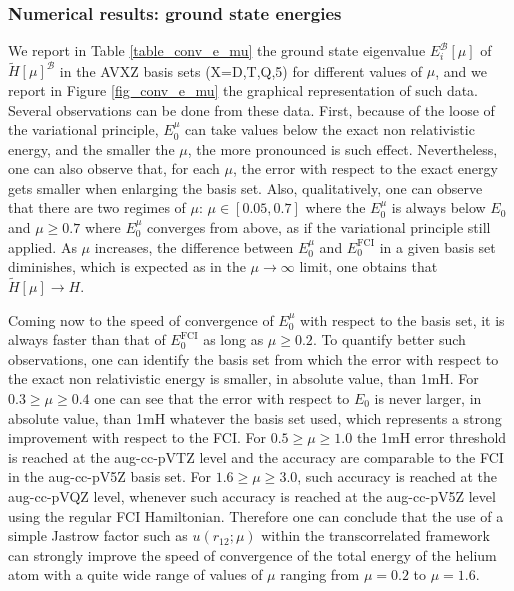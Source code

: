 \documentclass[aip,jcp,reprint,noshowkeys,superscriptaddress]{revtex4-1}
\newcommand{\basis}[0]{\mathcal{B}}
\begin{document}
\subsubsection{Numerical results: ground state energies}
\label{sec:total_e}
We report in Table \ref{table_conv_e_mu} the ground state eigenvalue $E_i^{\basis}[\mu]$ of $\tilde{H}[\mu]^{\basis}$ in the AVXZ basis sets (X=D,T,Q,5) for different values of $\mu$, and we report in Figure \ref{fig_conv_e_mu} the graphical representation of such data. 
Several observations can be done from these data. First, because of the loose of the variational principle, $E_0^{\mu}$ can take values below the exact non relativistic energy, and the smaller the $\mu$, the more pronounced is such effect. 
Nevertheless, one can also observe that, for each $\mu$, the error with respect to the exact energy gets smaller  
when enlarging the basis set. Also, qualitatively, one can observe that there are two regimes of $\mu$: $\mu \in[0.05,0.7]$ where the $E_0^\mu$ is always below $E_0$ and $\mu\ge 0.7$ where $E_0^\mu$ converges from above, as if the variational principle still applied. 
As $\mu$ increases, the difference between $E_0^\mu$ and $E_0^\text{FCI}$ in a given basis set diminishes, 
which is expected as in the $\mu \rightarrow \infty$ limit, one obtains that  $\tilde{H}[\mu] \rightarrow H$. 

Coming now to the speed of convergence of $E_0^\mu$ with respect to the basis set, it is always faster than that of $E_0^\text{FCI}$ as long as $\mu \ge 0.2$. 
To quantify better such observations, one can identify the basis set from which the error with respect to the exact non relativistic energy is smaller, in absolute value, than 1mH. 
For $0.3\ge\mu\ge0.4$ one can see that the error with respect to $E_0$ is never larger, in absolute value, than 1mH whatever the basis set used, which represents a strong improvement with respect to the FCI. For $0.5\ge \mu \ge 1.0$ the 1mH error threshold is reached at the aug-cc-pVTZ level and the accuracy are comparable to the FCI in the aug-cc-pV5Z basis set. For $1.6\ge \mu \ge 3.0$, such accuracy is reached at the aug-cc-pVQZ level, whenever such accuracy is reached at the aug-cc-pV5Z level using the regular FCI Hamiltonian. 
Therefore one can conclude that the use of a simple Jastrow factor such as $u(r_{12};\mu)$ within the transcorrelated framework can strongly improve the speed of convergence of the total energy of the helium atom with a quite wide range of values of $\mu$ ranging from $\mu=0.2$ to $\mu=1.6$. 
\end{document}
